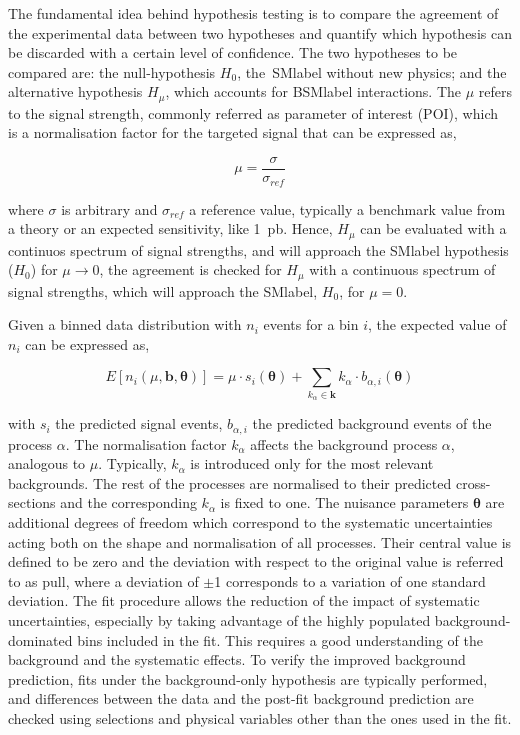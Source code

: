 The fundamental idea behind hypothesis testing is to compare the agreement of the experimental data between two hypotheses and quantify which hypothesis can be discarded with a certain level of confidence. The two hypotheses to be compared are: the null-hypothesis $H_0$, the~\acrshort{SMlabel} without new physics; and the alternative hypothesis $H_\mu$, which accounts for \acrshort{BSMlabel} interactions. The $\mu$ refers to the signal strength, commonly referred as parameter of interest (POI), which is a normalisation factor for the targeted signal that can be expressed as,

\begin{equation}
    \mu = \frac{\sigma}{\sigma_{ref}}
\end{equation}

where $\sigma$ is arbitrary and $\sigma_{ref}$ a reference value, typically a benchmark value from a theory or an expected sensitivity, like 1~pb. Hence, $H_\mu$ can be evaluated with a continuos spectrum of signal strengths, and will approach the \acrshort{SMlabel} hypothesis ($H_0$) for $\mu\to0$, the agreement is checked for $H_\mu$ with a continuous spectrum of signal strengths, which will approach the \acrshort{SMlabel}, $H_0$, for $\mu=0$.

Given a binned data distribution with $n_i$ events for a bin $i$, the expected value of $n_i$ can be expressed as,

\begin{equation}
    E[n_i(\mu,\mathbf{b},\boldsymbol{\theta})] = \mu\cdot s_i(\boldsymbol{\theta}) + \sum_{k_{\alpha}\in\mathbf{k}}k_\alpha\cdot b_{\alpha,i}(\boldsymbol{\theta})
\end{equation}

with $s_i$ the predicted signal events, $b_{\alpha,i}$ the predicted background events of the process $\alpha$. The normalisation factor $k_\alpha$ affects the background process $\alpha$, analogous to $\mu$. Typically, $k_\alpha$ is introduced only for the most relevant backgrounds. The rest of the processes are normalised to their predicted cross-sections and the corresponding $k_\alpha$ is fixed to one. The nuisance parameters $\boldsymbol{\theta}$ are additional degrees of freedom which correspond to the systematic uncertainties acting both on the shape and normalisation of all processes. Their central value is defined to be zero and the deviation with respect to the original value is referred to as pull, where a deviation of $\pm$1 corresponds to a variation of one standard deviation. The fit procedure allows the reduction of the impact of systematic uncertainties, especially by taking advantage of the highly populated background-dominated bins included in the fit. This requires a good understanding of the background and the systematic effects. To verify the improved background prediction, fits under the background-only hypothesis are typically performed, and differences between the data and the post-fit background prediction are checked using selections and physical variables other than the ones used in the fit.

